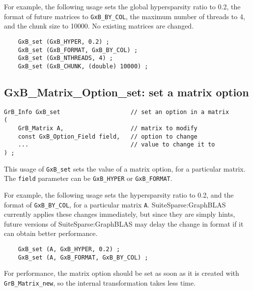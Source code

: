 \documentclass[12pt]{article}
\begin{document}
For example, the following usage sets the global hypersparsity ratio to 0.2,
the format of future matrices to \verb'GxB_BY_COL', the maximum number
of threads to 4, and the chunk size to 10000.
No existing matrices are changed.

{\footnotesize
\begin{verbatim}
    GxB_set (GxB_HYPER, 0.2) ;
    GxB_set (GxB_FORMAT, GxB_BY_COL) ;
    GxB_set (GxB_NTHREADS, 4) ;
    GxB_set (GxB_CHUNK, (double) 10000) ;
\end{verbatim} }

\subsection{{\sf GxB\_Matrix\_Option\_set:} set a matrix option}

\begin{mdframed}[userdefinedwidth=6in]
{\footnotesize
\begin{verbatim}
GrB_Info GxB_set                    // set an option in a matrix
(
    GrB_Matrix A,                   // matrix to modify
    const GxB_Option_Field field,   // option to change
    ...                             // value to change it to
) ;
\end{verbatim} } \end{mdframed}

This usage of \verb'GxB_set' sets the value of a matrix option, for a
particular matrix.
The \verb'field' parameter can be \verb'GxB_HYPER' or \verb'GxB_FORMAT'.

For example, the following usage sets the hypersparsity
ratio to 0.2, and the format of \verb'GxB_BY_COL', for a particular matrix
\verb'A'.  SuiteSparse:GraphBLAS currently applies these changes immediately,
but since they are simply hints, future versions of SuiteSparse:GraphBLAS may
delay the change in format if it can obtain better performance.

{\footnotesize
\begin{verbatim}
    GxB_set (A, GxB_HYPER, 0.2) ;
    GxB_set (A, GxB_FORMAT, GxB_BY_COL) ;
\end{verbatim} }

For performance, the matrix option should be set as soon as it is created with
\verb'GrB_Matrix_new', so the internal transformation takes less time.

\newpage
\end{document}
